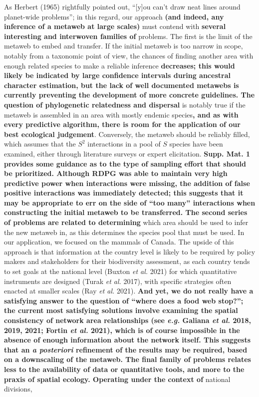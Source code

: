\documentclass[11pt]{article}
\makeatletter
\def\maxwidth{\ifdim\Gin@nat@width>\linewidth\linewidth
\else\Gin@nat@width\fi}
\let\Oldincludegraphics\includegraphics
\renewcommand{\includegraphics}[1]{\Oldincludegraphics[width=\maxwidth]{#1}}
\providecommand{\DIFaddtex}[1]{{\bf #1}} %
\providecommand{\DIFdeltex}[1]{} %
\providecommand{\DIFaddbegin}{\protect\color{blue}} %
\providecommand{\DIFaddend}{\protect\color{black}} %
\providecommand{\DIFdelbegin}{\protect\color{red}} %
\providecommand{\DIFdelend}{\protect\color{black}} %
\providecommand{\DIFadd}[1]{\texorpdfstring{\DIFaddtex{#1}}{#1}} %
\providecommand{\DIFdel}[1]{\texorpdfstring{\DIFdeltex{#1}}{}} %
\newcommand{\DIFscaledelfig}{0.5}
\newlength{\DIFdelgraphicswidth} %
\newlength{\DIFdelgraphicsheight} %
\newcommand{\DIFaddincludegraphics}[2][]{{\color{blue}\fbox{\DIFOincludegraphics[#1]{#2}}}} %
\newcommand{\DIFdelincludegraphics}[2][]{%
\sbox{\DIFdelgraphicsbox}{\DIFOincludegraphics[#1]{#2}}%
\settoboxwidth{\DIFdelgraphicswidth}{\DIFdelgraphicsbox} %
\settoboxtotalheight{\DIFdelgraphicsheight}{\DIFdelgraphicsbox} %
\scalebox{\DIFscaledelfig}{%
\parbox[b]{\DIFdelgraphicswidth}{\usebox{\DIFdelgraphicsbox}\\[-\baselineskip] \rule{\DIFdelgraphicswidth}{0em}}\llap{\resizebox{\DIFdelgraphicswidth}{\DIFdelgraphicsheight}{%
\setlength{\unitlength}{\DIFdelgraphicswidth}%
\begin{picture}(1,1)%
\thicklines\linethickness{2pt} %
{\color[rgb]{1,0,0}\put(0,0){\framebox(1,1){}}}%
{\color[rgb]{1,0,0}\put(0,0){\line( 1,1){1}}}%
{\color[rgb]{1,0,0}\put(0,1){\line(1,-1){1}}}%
\end{picture}%
}\hspace*{3pt}}} %
} %
\DeclareRobustCommand{\DIFaddbegin}{\DIFOaddbegin \let\includegraphics\DIFaddincludegraphics} %
\DeclareRobustCommand{\DIFaddend}{\DIFOaddend \let\includegraphics\DIFOincludegraphics} %
\DeclareRobustCommand{\DIFdelbegin}{\DIFOdelbegin \let\includegraphics\DIFdelincludegraphics} %
\DeclareRobustCommand{\DIFdelend}{\DIFOaddend \let\includegraphics\DIFOincludegraphics} %
\makeatother
\begin{document}
As Herbert (1965) rightfully pointed out, ``{[}y{]}ou can't draw neat
lines around planet-wide problems''; in this regard, our approach \DIFaddbegin \DIFadd{(and
indeed, any inference of a metaweb at large scales) }\DIFaddend must contend with
\DIFdelbegin \DIFdel{two interesting }\DIFdelend \DIFaddbegin \DIFadd{several interesting and interwoven families of }\DIFaddend problems. The first is
the limit of the metaweb to embed and transfer. If the initial metaweb
is too narrow in scope, notably from a taxonomic point of view, the
chances of finding another area with enough related species to make a
reliable inference \DIFdelbegin \DIFdel{decrease. This }\DIFdelend \DIFaddbegin \DIFadd{decreases; this would likely be indicated by large
confidence intervals during ancestral character estimation, but the lack
of well documented metawebs is currently preventing the development of
more concrete guidelines. The question of phylogenetic relatedness and
dispersal }\DIFaddend is notably true if the metaweb is assembled in an area with
mostly endemic species\DIFaddbegin \DIFadd{, and as with every predictive algorithm, there is
room for the application of our best ecological judgement}\DIFaddend . Conversely,
the metaweb should be reliably filled, which assumes that the \(S^2\)
interactions in a pool of \(S\) species have been examined, either
through literature surveys or expert elicitation. \DIFdelbegin \DIFdel{The second problem is to determine }\DIFdelend \DIFaddbegin \DIFadd{Supp. Mat. 1 provides
some guidance as to the type of sampling effort that should be
prioritized. Although RDPG was able to maintain very high predictive
power when interactions were missing, the addition of false positive
interactions was immediately detected; this suggests that it may be
appropriate to err on the side of ``too many'' interactions when
constructing the initial metaweb to be transferred. The second series of
problems are related to determining }\DIFaddend which area should be used to infer
the new metaweb in, as this determines the species pool that must be
used. In our application, we focused on the mammals of Canada. The
upside of this approach is that information at the country level is
likely to be required by policy makers and stakeholders for their
biodiversity assessment, as each country tends to set goals at the
national level (Buxton \emph{et al.} 2021) for which quantitative
instruments are designed (Turak \emph{et al.} 2017), with specific
strategies often enacted at smaller scales (Ray \emph{et al.} 2021). \DIFdelbegin \DIFdel{Yet
these }\DIFdelend \DIFaddbegin \DIFadd{And
yet, we do not really have a satisfying answer to the question of
``where does a food web stop?''; the current most satisfying solutions
involve examining the spatial consistency of network area relationships
(see \emph{e.g.} Galiana \emph{et al.} 2018, 2019, 2021; Fortin \emph{et
al.} 2021), which is of course impossible in the absence of enough
information about the network itself. This suggests that an \emph{a
posteriori} refinement of the results may be required, based on a
downscaling of the metaweb. The final family of problems relates less to
the availability of data or quantitative tools, and more to the praxis
of spatial ecology. Operating under the context of }\DIFaddend national divisions,
\end{document}

